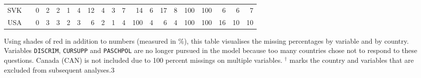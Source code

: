 {\begin{tabular}{ccrrrrrrrrrrrrrrrrrr}
        SVK   &       & 0     & \cellcolor[rgb]{ 1,  .98,  .98}2 & \cellcolor[rgb]{ 1,  .98,  .98}2 & \cellcolor[rgb]{ 1,  .988,  .988}1 & \cellcolor[rgb]{ 1,  .961,  .961}4 & \cellcolor[rgb]{ 1,  .886,  .886}12 & \cellcolor[rgb]{ 1,  .965,  .965}4 & \cellcolor[rgb]{ 1,  .976,  .976}3 & \cellcolor[rgb]{ 1,  .929,  .929}7 & \cellcolor[rgb]{ 1,  .859,  .859}14 & \cellcolor[rgb]{ 1,  .945,  .945}6 & \cellcolor[rgb]{ 1,  .831,  .831}17 & \cellcolor[rgb]{ 1,  .922,  .922}8 & \cellcolor[rgb]{ 1,  0,  0}100 & \cellcolor[rgb]{ 1,  0,  0}100 & \cellcolor[rgb]{ 1,  .937,  .937}6 & \cellcolor[rgb]{ 1,  .945,  .945}6 & \cellcolor[rgb]{ 1,  .929,  .929}7 \\
        USA   &       & 0     & \cellcolor[rgb]{ 1,  .976,  .976}3 & \cellcolor[rgb]{ 1,  .976,  .976}3 & \cellcolor[rgb]{ 1,  .984,  .984}2 & \cellcolor[rgb]{ 1,  .973,  .973}3 & \cellcolor[rgb]{ 1,  .945,  .945}6 & \cellcolor[rgb]{ 1,  .984,  .984}2 & \cellcolor[rgb]{ 1,  .988,  .988}1 & \cellcolor[rgb]{ 1,  .965,  .965}4 & \cellcolor[rgb]{ 1,  0,  0}100 & \cellcolor[rgb]{ 1,  .965,  .965}4 & \cellcolor[rgb]{ 1,  .945,  .945}6 & \cellcolor[rgb]{ 1,  .957,  .957}4 & \cellcolor[rgb]{ 1,  0,  0}100 & \cellcolor[rgb]{ 1,  0,  0}100 & \cellcolor[rgb]{ 1,  .847,  .847}16 & \cellcolor[rgb]{ 1,  .906,  .906}10 & \cellcolor[rgb]{ 1,  .906,  .906}10 \\
        \bottomrule
        \end{tabular}
}{Using shades of red in addition to numbers (measured in \%), this table visualises the missing percentages by variable and by country. Variables \texttt{DISCRIM}, \texttt{CURSUPP} and \texttt{PASCHPOL} are no longer pursued in the model because too many countries chose not to respond to these questions. Canada (CAN) is not included due to 100 percent missings on multiple variables. $^\dagger$ marks the country and variables that are excluded from subsequent analyses.}{3}